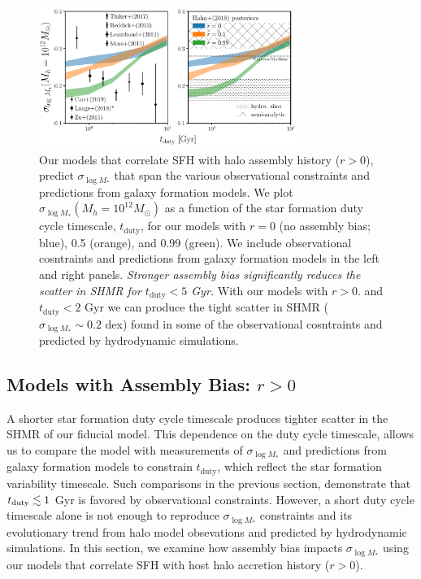 \documentclass[12pt, letterpaper, preprint, tighten]{aastex62}
\newcommand{\edt}[1]{{\color{dred}{\bf} #1}}
\newcommand{\siglogm}{\sigma_{\log M_*}}
\begin{document}
\begin{figure}
\begin{center}
\includegraphics[width=0.75\textwidth]{figs/SHMRscatter_tduty_abias2.pdf}
    \caption{\edt{Our models that correlate SFH with halo assembly history ($r > 0$),
    predict $\siglogm$ that span the various observational constraints and predictions 
    from galaxy formation models.}
    We plot $\siglogm(M_h=10^{12}M_\odot)$ as a function of the star formation
    duty cycle timescale, $t_\mathrm{duty}$, for our
    \edt{models with $r = 0$ (no assembly bias; blue), 0.5 (orange), and 0.99 (green).
    We include observational cosntraints and predictions from galaxy formation models
    in the left and right panels.
    \emph{Stronger assembly bias significantly reduces the scatter in SHMR for
    $t_\mathrm{duty} < 5$ Gyr.}
    With our models with $r > 0.$ and $t_\mathrm{duty} < 2$ Gyr
    we can produce the tight scatter in SHMR ($\siglogm \sim 0.2$ dex) found in
    some of the observational cosntraints and predicted by hydrodynamic simulations}.
    }
\label{fig:sigMstar_duty_abias}
\end{center}
\end{figure}

\subsection{\edt{Models with Assembly Bias: $r > 0$}}
A shorter star formation duty cycle timescale produces tighter scatter in the
SHMR of our \edt{fiducial} model. This dependence on the duty cycle timescale,
allows us to compare the model with measurements of $\siglogm$ and
predictions from galaxy formation models to constrain $t_\mathrm{duty}$, which
reflect the star formation variability timescale. Such comparisons in the previous
section, demonstrate that $t_{\rm duty} \lesssim 1$ Gyr is favored by 
observational constraints. However, a short duty cycle timescale alone is not 
enough to reproduce $\siglogm$ constraints and its evolutionary trend 
\edt{from halo model obsevations and predicted by hydrodynamic simulations.
In this section, we examine how assembly bias impacts $\siglogm$
using our models that correlate SFH with host halo accretion history ($r > 0$).}
\end{document}
